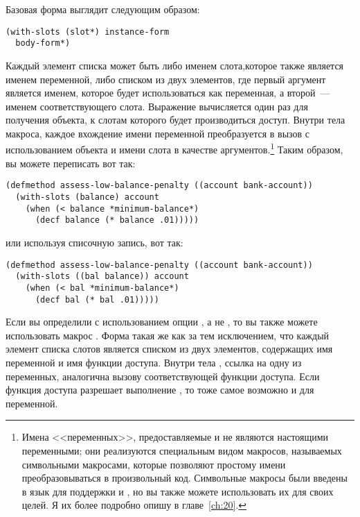 Базовая форма   выглядит следующим образом:

\begin{lstlisting}
(with-slots (slot*) instance-form
  body-form*)
\end{lstlisting}

Каждый элемент списка  может быть либо именем слота,которое также является
именем переменной, либо списком из двух элементов, где первый аргумент является именем,
которое будет использоваться как переменная, а второй~--- именем соответствующего слота.
Выражение  вычисляется один раз для получения объекта, к слотам
которого будет производиться доступ.  Внутри тела макроса, каждое вхождение имени
переменной преобразуется в вызов  с использованием объекта и имени слота
в качестве аргументов.\footnote{Имена <<переменных>>, предоставляемые  и
   не являются настоящими переменными; они реализуются специальным
  видом макросов, называемых символьными макросами, которые позволяют простому имени
  преобразовываться в произвольный код.  Символьные макросы были введены в язык для
  поддержки  и , но вы также можете использовать их
  для своих целей.  Я их более подробно опишу в главе~\ref{ch:20}.}  Таким образом, вы можете
  переписать  вот так:

\begin{lstlisting}
(defmethod assess-low-balance-penalty ((account bank-account))
  (with-slots (balance) account
    (when (< balance *minimum-balance*)
      (decf balance (* balance .01)))))
\end{lstlisting}

\noindent{}или используя списочную запись, вот так:

\begin{lstlisting}
(defmethod assess-low-balance-penalty ((account bank-account))
  (with-slots ((bal balance)) account
    (when (< bal *minimum-balance*)
      (decf bal (* bal .01)))))
\end{lstlisting}

Если вы определили  с использованием опции , а не
, то вы также можете использовать макрос .  Форма
 такая же как  за тем исключением, что каждый
элемент списка слотов является списком из двух элементов, содержащих имя переменной и имя
функции доступа.  Внутри тела , ссылка на одну из переменных,
аналогична вызову соответствующей функции доступа.  Если функция доступа разрешает
выполнение , то тоже самое возможно и для переменной.

